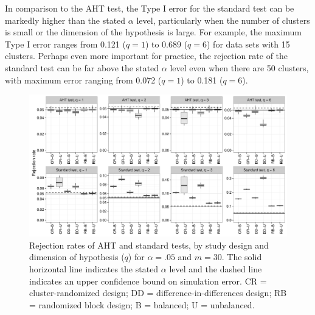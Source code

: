 \documentclass[12pt]{article}\usepackage[]{graphicx}\usepackage[]{color}
\newenvironment{knitrout}{}{} %
\begin{document}
In comparison to the AHT test, the Type I error for the standard test can be markedly higher than the stated $\alpha$ level, particularly when the number of clusters is small or the dimension of the hypothesis is large. 
For example, the maximum Type I error ranges from 0.121 ($q = 1$) to 0.689 ($q = 6$) for data sets with 15 clusters.
Perhaps even more important for practice, the rejection rate of the standard test can be far above the stated $\alpha$ level even when there are 50 clusters, with maximum error ranging from 0.072 ($q = 1$) to 0.181 ($q = 6$). 

\begin{knitrout}
\color{fgcolor}\begin{figure}

{\centering \includegraphics[width=\linewidth]{CR_fig/balance-1} 

}

\caption[Rejection rates of AHT and standard tests, by study design and dimension of hypothesis (]{Rejection rates of AHT and standard tests, by study design and dimension of hypothesis ($q$) for $\alpha = .05$ and $m = 30$. The solid horizontal line indicates the stated $\alpha$ level and the dashed line indicates an upper confidence bound on simulation error. CR = cluster-randomized design; DD = difference-in-differences design; RB = randomized block design; B = balanced; U = unbalanced.}\label{fig:balance}
\end{figure}


\end{knitrout}
\end{document}
